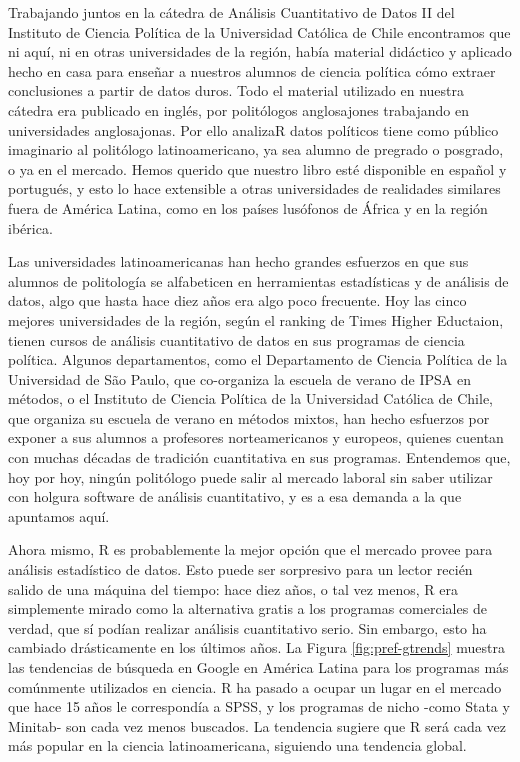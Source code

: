 \documentclass[]{book}
\begin{document}
Trabajando juntos en la cátedra de Análisis Cuantitativo de Datos II del
Instituto de Ciencia Política de la Universidad Católica de Chile
encontramos que ni aquí, ni en otras universidades de la región, había
material didáctico y aplicado hecho en casa para enseñar a nuestros
alumnos de ciencia política cómo extraer conclusiones a partir de datos
duros. Todo el material utilizado en nuestra cátedra era publicado en
inglés, por politólogos anglosajones trabajando en universidades
anglosajonas. Por ello analizaR datos políticos tiene como público
imaginario al politólogo latinoamericano, ya sea alumno de pregrado o
posgrado, o ya en el mercado. Hemos querido que nuestro libro esté
disponible en español y portugués, y esto lo hace extensible a otras
universidades de realidades similares fuera de América Latina, como en
los países lusófonos de África y en la región ibérica.

Las universidades latinoamericanas han hecho grandes esfuerzos en que
sus alumnos de politología se alfabeticen en herramientas estadísticas y
de análisis de datos, algo que hasta hace diez años era algo poco
frecuente. Hoy las cinco mejores universidades de la región, según el
ranking de Times Higher Eductaion, tienen cursos de análisis
cuantitativo de datos en sus programas de ciencia política. Algunos
departamentos, como el Departamento de Ciencia Política de la
Universidad de São Paulo, que co-organiza la escuela de verano de IPSA
en métodos, o el Instituto de Ciencia Política de la Universidad
Católica de Chile, que organiza su escuela de verano en métodos mixtos,
han hecho esfuerzos por exponer a sus alumnos a profesores
norteamericanos y europeos, quienes cuentan con muchas décadas de
tradición cuantitativa en sus programas. Entendemos que, hoy por hoy,
ningún politólogo puede salir al mercado laboral sin saber utilizar con
holgura software de análisis cuantitativo, y es a esa demanda a la que
apuntamos aquí.

Ahora mismo, R es probablemente la mejor opción que el mercado provee
para análisis estadístico de datos. Esto puede ser sorpresivo para un
lector recién salido de una máquina del tiempo: hace diez años, o tal
vez menos, R era simplemente mirado como la alternativa gratis a los
programas comerciales de verdad, que sí podían realizar análisis
cuantitativo serio. Sin embargo, esto ha cambiado drásticamente en los
últimos años. La Figura \ref{fig:pref-gtrends} muestra las tendencias de
búsqueda en Google en América Latina para los programas más comúnmente
utilizados en ciencia. R ha pasado a ocupar un lugar en el mercado que
hace 15 años le correspondía a SPSS, y los programas de nicho -como
Stata y Minitab- son cada vez menos buscados. La tendencia sugiere que R
será cada vez más popular en la ciencia latinoamericana, siguiendo una
tendencia global.
\end{document}
